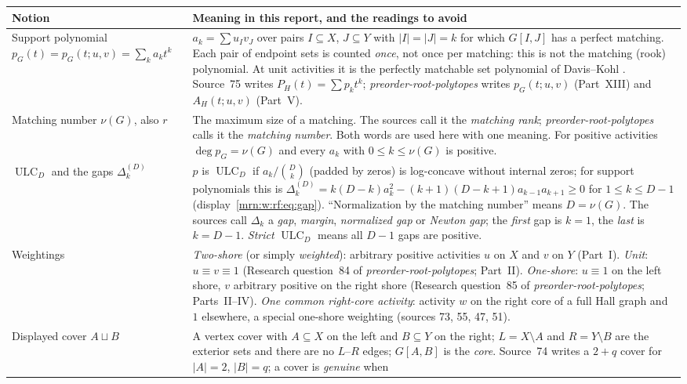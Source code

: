 \documentclass[11pt,a4paper]{article}
\theoremstyle{remark}\newtheorem{remark}[theorem]{Remark}
\newcommand{\ULC}{\operatorname{ULC}}      %
\newcommand{\prp}{\emph{preorder-root-polytopes}}
\begin{document}
\begin{longtable}{>{\raggedright\arraybackslash}p{}>{\raggedright\arraybackslash}p{}}
\toprule
Notion & Meaning in this report, and the readings to avoid\\
\midrule
\endhead
\bottomrule
\endfoot
Support polynomial $p_G(t)=p_G(t;u,v)=\sum_ka_kt^k$ &
$a_k=\sum u_Iv_J$ over pairs $I\subseteq X$, $J\subseteq Y$ with
$|I|=|J|=k$ for which $G[I,J]$ has a perfect matching. Each pair of endpoint
sets is counted \emph{once}, not once per matching: this is not the
matching (rook) polynomial. At unit activities it is the perfectly
matchable set polynomial of Davis--Kohl \cite{b:DK}. Source~75 writes
$P_H(t)=\sum p_kt^k$; \prp{} writes $p_G(t;u,v)$ (Part~XIII) and
$A_H(t;u,v)$ (Part~V).\\
Matching number $\nu(G)$, also $r$ &
The maximum size of a matching. The sources call it the \emph{matching
rank}; \prp{} calls it the \emph{matching number}. Both words are used
here with one meaning. For positive activities $\deg p_G=\nu(G)$ and every
$a_k$ with $0\le k\le\nu(G)$ is positive.\\
$\ULC_D$ and the gaps $\Delta_k^{(D)}$ &
$p$ is $\ULC_D$ if $a_k/\binom Dk$ (padded by zeros) is log-concave
without internal zeros; for support polynomials this is
$\Delta_k^{(D)}=k(D-k)a_k^2-(k+1)(D-k+1)a_{k-1}a_{k+1}\ge0$ for
$1\le k\le D-1$ (display~\eqref{mrn:w:rf:eq:gap}). ``Normalization by the
matching number'' means $D=\nu(G)$. The sources call $\Delta_k$ a
\emph{gap}, \emph{margin}, \emph{normalized gap} or \emph{Newton gap};
the \emph{first} gap is $k=1$, the \emph{last} is $k=D-1$. \emph{Strict}
$\ULC_D$ means all $D-1$ gaps are positive.\\
Weightings &
\emph{Two-shore} (or simply \emph{weighted}): arbitrary positive activities
$u$ on $X$ and $v$ on $Y$ (Part~I). \emph{Unit}: $u\equiv v\equiv1$
(Research question~84 of \prp; Part~II). \emph{One-shore}: $u\equiv1$ on
the left shore, $v$ arbitrary positive on the right shore (Research
question~85 of \prp; Parts~II--IV). \emph{One common right-core
activity}: activity $w$ on the right core of a full Hall graph and~$1$
elsewhere, a special one-shore weighting (sources 73, 55, 47, 51).\\
Displayed cover $A\sqcup B$ &
A vertex cover with $A\subseteq X$ on the left and $B\subseteq Y$ on the
right; $L=X\setminus A$ and $R=Y\setminus B$ are the exterior sets and
there are no $L$--$R$ edges; $G[A,B]$ is the \emph{core}. Source~74 writes
a $2+q$ cover for $|A|=2$, $|B|=q$; a cover is \emph{genuine} when

\end{longtable}
\end{document}
